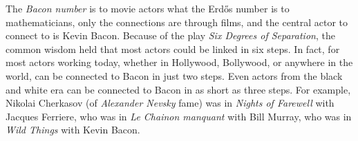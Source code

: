 \documentclass[12pt]{article}
\begin{document}

The {\em Bacon number} is to movie actors what the Erd\H{o}s number is to mathematicians, only the connections are through films, and the central actor to connect to is Kevin Bacon. Because of the play {\it Six Degrees of Separation}, the common wisdom held that most actors could be linked in six steps. In fact, for most actors working today, whether in Hollywood, Bollywood, or anywhere in the world, can be connected to Bacon in just two steps. Even actors from the black and white era can be connected to Bacon in as short as three steps. For example, Nikolai Cherkasov (of {\it Alexander Nevsky} fame) was in {\it Nights of Farewell} with Jacques Ferriere, who was in {\it Le Chainon manquant} with Bill Murray, who was in {\it Wild Things} with Kevin Bacon. 
\end{document}
